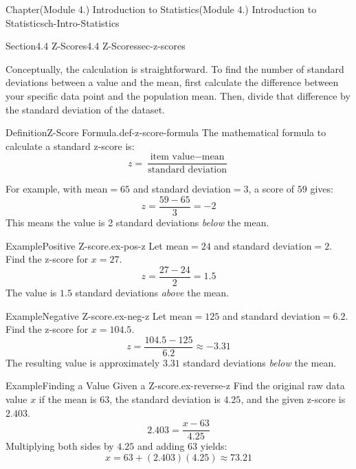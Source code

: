 \documentclass[oneside,10pt,]{book}
\begin{document}
\begin{chapterptx}{Chapter}{(Module 4.) Introduction to Statistics}{}{(Module 4.) Introduction to Statistics}{}{}{ch-Intro-Statistics}
\begin{sectionptx}{Section}{4.4 Z-Scores}{}{4.4 Z-Scores}{}{}{sec-z-scores}
\begin{introduction}{}
\par
Conceptually, the calculation is straightforward. To find the number of standard deviations between a value and the mean, first calculate the difference between your specific data point and the population mean. Then, divide that difference by the standard deviation of the dataset.%
\end{introduction}%
\begin{definition}{Definition}{Z-Score Formula.}{def-z-score-formula}%
The mathematical formula to calculate a standard z-score is:%
\begin{equation*}
z = \frac{\text{item value} - \text{mean}}{\text{standard deviation}} 
\end{equation*}
%
\end{definition}
For example, with mean\(= 65\) and standard deviation\(= 3\), a score of \(59\) gives:%
\begin{equation*}
z = \frac{59 - 65}{3} = -2
\end{equation*}
This means the value is 2 standard deviations \emph{below} the mean.%
\begin{example}{Example}{Positive Z-score.}{ex-pos-z}%
Let mean\(= 24\) and standard deviation\(= 2\). Find the z-score for \(x = 27\).%
\begin{equation*}
z = \frac{27 - 24}{2} = 1.5
\end{equation*}
The value is \(1.5\) standard deviations \emph{above} the mean.%
\end{example}
\begin{example}{Example}{Negative Z-score.}{ex-neg-z}%
Let mean\(= 125\) and standard deviation\(= 6.2\). Find the z-score for \(x = 104.5\).%
\begin{equation*}
z = \frac{104.5 - 125}{6.2} \approx -3.31
\end{equation*}
The resulting value is approximately \(3.31\) standard deviations \emph{below} the mean.%
\end{example}
\begin{example}{Example}{Finding a Value Given a Z-score.}{ex-reverse-z}%
Find the original raw data value \(x\) if the mean is \(63\), the standard deviation is \(4.25\), and the given z-score is \(2.403\).%
\begin{equation*}
2.403 = \frac{x - 63}{4.25}
\end{equation*}
Multiplying both sides by \(4.25\) and adding \(63\) yields:%
\begin{equation*}
x = 63 + (2.403)(4.25) \approx 73.21
\end{equation*}

\end{example}
\end{sectionptx}
\end{chapterptx}
\end{document}
